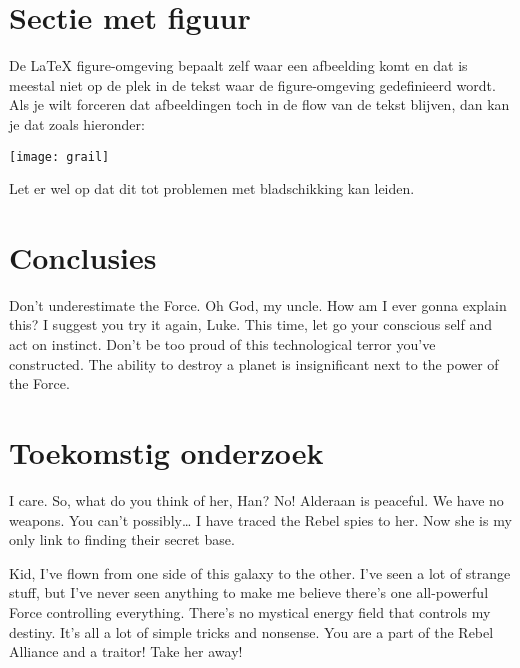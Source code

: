 \documentclass[a0,portrait]{hogent-poster}
\begin{document}
\begin{multicols}{2}
\section{Sectie met figuur}

De {\LaTeX} figure-omgeving bepaalt zelf waar een afbeelding komt en dat is meestal niet op de plek in de tekst waar de figure-omgeving gedefinieerd wordt. Als je wilt forceren dat afbeeldingen toch in de flow van de tekst blijven, dan kan je dat zoals hieronder:

\begin{center}
  \captionsetup{type=figure}
  \texttt{[image: grail]}
\end{center}

Let er wel op dat dit tot problemen met bladschikking kan leiden.

\section{Conclusies}

Don't underestimate the Force. Oh God, my uncle. How am I ever gonna explain this? I suggest you try it again, Luke. This time, let go your conscious self and act on instinct. Don't be too proud of this technological terror you've constructed. The ability to destroy a planet is insignificant next to the power of the Force.

\section{Toekomstig onderzoek}

I care. So, what do you think of her, Han? No! Alderaan is peaceful. We have no weapons. You can't possibly… I have traced the Rebel spies to her. Now she is my only link to finding their secret base.

Kid, I've flown from one side of this galaxy to the other. I've seen a lot of strange stuff, but I've never seen anything to make me believe there's one all-powerful Force controlling everything. There's no mystical energy field that controls my destiny. It's all a lot of simple tricks and nonsense. You are a part of the Rebel Alliance and a traitor! Take her away!

\end{multicols}
\end{document}
